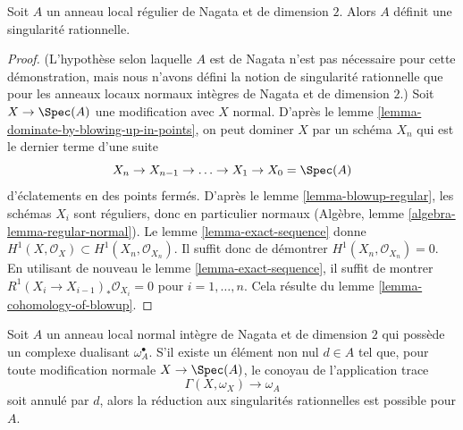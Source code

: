 \begin{lemma} \label{lemma-regular-rational} Soit $A$ un anneau local régulier de Nagata et de dimension $2$. Alors $A$ définit une singularité rationnelle. \end{lemma}

\begin{proof} (L'hypothèse selon laquelle $A$ est de Nagata n'est pas nécessaire pour cette démonstration, mais nous n'avons défini la notion de singularité rationnelle que pour les anneaux locaux normaux intègres de Nagata et de dimension $2$.) Soit $X \to \Spec(A)$ une modification avec $X$ normal. D'après le lemme \ref{lemma-dominate-by-blowing-up-in-points}, on peut dominer $X$ par un schéma $X_n$ qui est le dernier terme d'une suite $$
X_n \to X_{n - 1} \to \ldots \to X_1 \to X_0 = \Spec(A)
$$ d'éclatements en des points fermés. D'après le lemme \ref{lemma-blowup-regular}, les schémas $X_i$ sont réguliers, donc en particulier normaux (Algèbre, lemme \ref{algebra-lemma-regular-normal}). Le lemme \ref{lemma-exact-sequence} donne $H^1(X, \mathcal{O}_X) \subset H^1(X_n, \mathcal{O}_{X_n})$. Il suffit donc de démontrer $H^1(X_n, \mathcal{O}_{X_n}) = 0$. En utilisant de nouveau le lemme \ref{lemma-exact-sequence}, il suffit de montrer $R^1(X_i \to X_{i - 1})_*\mathcal{O}_{X_i} = 0$ pour $i = 1, \ldots, n$. Cela résulte du lemme \ref{lemma-cohomology-of-blowup}. \end{proof}

\begin{lemma} \label{lemma-bound-dualizing-implies-bound} Soit $A$ un anneau local normal intègre de Nagata et de dimension $2$ qui possède un complexe dualisant $\omega_A^\bullet$. S'il existe un élément non nul $d \in A$ tel que, pour toute modification normale $X \to \Spec(A)$, le conoyau de l'application trace $$
\Gamma(X, \omega_X) \to \omega_A
$$ soit annulé par $d$, alors la réduction aux singularités rationnelles est possible pour $A$. \end{lemma}

